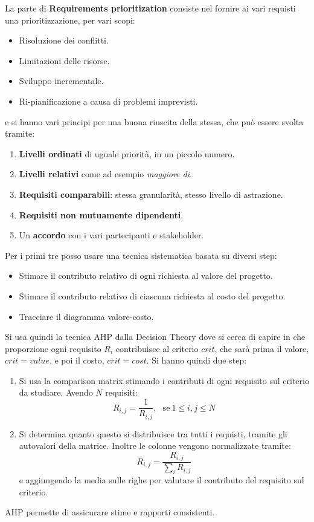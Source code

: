 La parte di \textbf{Requirements prioritization} consiste nel fornire ai vari requisti una prioritizzazione, per vari scopi:
\begin{itemize}
    \item Risoluzione dei conflitti.
    \item Limitazioni delle risorse.
    \item Sviluppo incrementale.
    \item Ri-pianificazione a causa di problemi imprevisti.
\end{itemize}
e si hanno vari principi per una buona riuscita della stessa, che può essere svolta tramite:
\begin{enumerate}
    \item \textbf{Livelli ordinati} di uguale priorità, in un piccolo numero.
    \item \textbf{Livelli relativi} come ad esempio \textit{maggiore di}.
    \item \textbf{Requisiti comparabili}: stessa granularità, stesso livello di astrazione.
    \item \textbf{Requisiti non mutuamente dipendenti}.
    \item Un \textbf{accordo} con i vari partecipanti e stakeholder.
\end{enumerate}
Per i primi tre posso usare una tecnica sistematica basata su diversi step:
\begin{itemize}
    \item Stimare il contributo relativo di ogni richiesta al valore del progetto.
    \item Stimare il contributo relativo di ciascuna richiesta al costo del progetto.
    \item Tracciare il diagramma valore-costo.
\end{itemize}

Si usa quindi la tecnica AHP dalla Decision Theory dove si cerca di capire in che proporzione ogni requisito $R_i$ contribuisce al criterio $crit$, che sarà prima il valore, $crit = value$, e poi il costo, $crit = cost$. Si hanno quindi due step:
\begin{enumerate}
    \item Si usa la comparison matrix stimando i contributi di ogni requisito sul criterio da studiare. Avendo $N$ requisiti:
    \begin{equation}
        R_{i, j} = \frac{1}{R_{i, j}}, \ \ \ \text{se} \ 1 \leq i, j\leq N
    \end{equation}
    \item Si determina quanto questo si distribuisce tra tutti i requisti, tramite gli autovalori della matrice. Inoltre le colonne vengono normalizzate tramite:
    \begin{equation}
        R_{i, j} = \frac{R_{i, j}}{\sum_i R_{i, j}}
    \end{equation}
    e aggiungendo la media sulle righe per valutare il contributo del requisito sul criterio.
\end{enumerate}
AHP permette di assicurare stime e rapporti consistenti.
